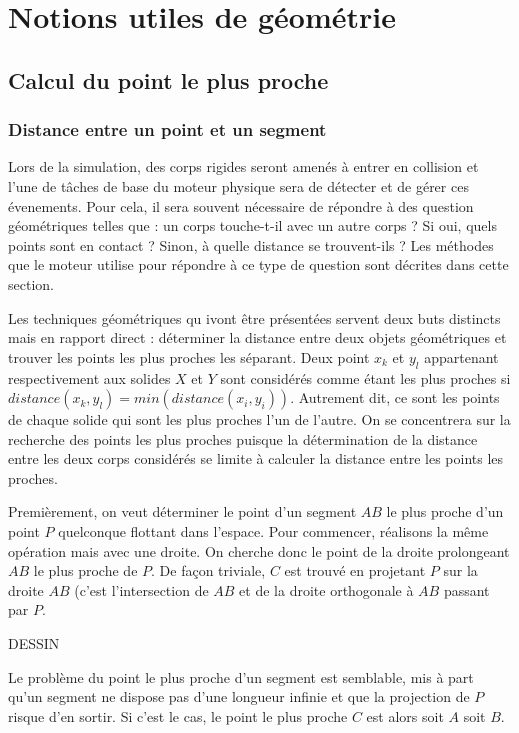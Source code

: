 \section{Notions utiles de géométrie}

\subsection{Calcul du point le plus proche}

\subsubsection{Distance entre un point et un segment}

Lors de la simulation, des corps rigides seront amenés à entrer en collision et l'une de tâches de base du moteur physique sera de détecter et de gérer ces évenements. Pour cela, il sera souvent nécessaire de répondre à des question géométriques telles que : un corps touche-t-il avec un autre corps ? Si oui, quels points sont en contact ? Sinon, à quelle distance se trouvent-ils ? Les méthodes que le moteur utilise pour répondre à ce type de question sont décrites dans cette section.

Les techniques géométriques qu ivont être présentées servent deux buts distincts mais en rapport direct : déterminer la distance entre deux objets géométriques et trouver les points les plus proches les séparant. Deux point $x_k$ et $y_l$ appartenant respectivement aux solides $X$ et $Y$ sont considérés comme étant les plus proches si $distance(x_k,y_l) = min(distance(x_i, y_i))$. Autrement dit, ce sont les points de chaque solide qui sont les plus proches l'un de l'autre. On se concentrera sur la recherche des points les plus proches puisque la détermination de la distance entre les deux corps considérés se limite à calculer la distance entre les points les proches.

Premièrement, on veut déterminer le point d'un segment $AB$ le plus proche d'un point $P$ quelconque flottant dans l'espace. Pour commencer, réalisons la même opération mais avec une droite. On cherche donc le point de la droite prolongeant $AB$ le plus proche de $P$. De façon triviale, $C$ est trouvé en projetant $P$ sur la droite $AB$ (c'est l'intersection de $AB$ et de la droite orthogonale à $AB$ passant par $P$.

DESSIN

Le problème du point le plus proche d'un segment est semblable, mis à part qu'un segment ne dispose pas d'une longueur infinie et que la projection de $P$ risque d'en sortir. Si c'est le cas, le point le plus proche $C$ est alors soit $A$ soit $B$.

